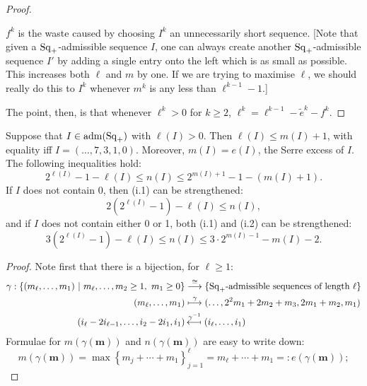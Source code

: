 \documentclass[10pt]{article}
\newcommand{\admis}[1]{\mathrm{adm}(#1)}%
\newcommand{\SqShift}{\Sq_{\smash{+}}}
\newcommand{\Sq}{\mathrm{Sq}}
\newcommand{\minDim}{m}
\begin{document}
\begin{KoszulSequenceCombinatorics}
\begin{Omitted}
\begin{proof}
\begin{itemise}
\item $f^k$ is the waste caused by choosing $I^k$ an unnecessarily short sequence. [Note that given a $\SqShift$-admissible sequence $I$, one can always create another $\SqShift$-admissible sequence $I'$ by adding a single entry onto the left which is as small as possible. This increases both $\ell$ and $\minDim$ by one. If we are trying to maximise $\ell$, we should really do this to $I^k$ whenever $\minDim^k$ is any less than $\ell^{k-1}-1$.]
\end{itemise}
The point, then, is that whenever $\ell^k>0$ for $k\geq2$, $\ell^k=\ell^{k-1}-\widetilde{e}^k-f^k$.
\end{proof}
\end{Omitted}

\begin{lem}
Suppose that $I\in\admis{\SqShift}$ with $\ell(I)>0$. Then $\ell(I)\leq \minDim(I)+1$, with equality iff $I=(\ldots,7,3,1,0)$. Moreover, $\minDim(I)=e(I)$, the Serre excess of $I$. The following inequalities hold:
\begin{equation}
2^{\ell(I)}-1-\ell(I)\leq n(I)\leq2^{\minDim(I)+1}-1-(\minDim(I)+1).\tag{i.1) \& (i.2}
\end{equation}
If $I$ does not contain 0, then \textup{(i.1)} can be strengthened:
\[2(2^{\ell(I)}-1)-\ell(I)\leq n(I),\]
and if $I$ does not contain either 0 or 1, both \textup{(i.1)} and \textup{(i.2)} can be strengthened:
\[3(2^{\ell(I)}-1)-\ell(I)\leq n(I)\leq 3\cdot2^{\minDim(I)-1}-\minDim(I)-2.\]
\end{lem}
\begin{proof}
Note first that there is a bijection, for $\ell\geq1$:
\begin{alignat*}{2}
\gamma:\left\{(m_{\ell},\ldots,m_1)\ \middle|\ m_\ell,\ldots,m_2\geq1,\ m_1\geq0\right\}&\overset{\cong}{\to}\left\{\textup{$\SqShift$-admissible sequences of length $\ell$}\right\}
\\
(m_\ell,\ldots,m_1)
&\overset{\gamma}{\mapsto}
(\ldots,2^2m_1+2m_2+m_3,2m_1+m_2,m_1)\\
(i_\ell-2i_{\ell-1},\ldots,i_2-2i_1,i_1)
&\overset{\gamma^{-1}}{\mapsfrom}
(i_\ell,\ldots,i_1)%
\end{alignat*}
Formulae for $m(\gamma(\textbf{m}))$ and $n(\gamma(\textbf{m}))$ are easy to write down:
\[m(\gamma(\textbf{m}))=\max\left\{m_j+\cdots +m_1\right\}_{j=1}^\ell=m_\ell+\cdots +m_1=:e(\gamma(\textbf{m}));\]
\[%
\]
\end{proof}
\end{KoszulSequenceCombinatorics}
\end{document}
